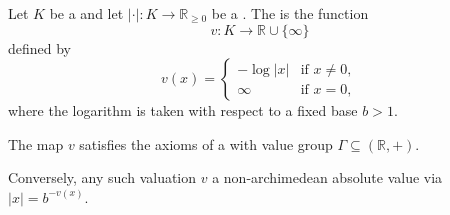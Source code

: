 \begin{definition} \label{definition:valuation_induced_by_a_nonarchimedean_absolute_value_on_a_field}
Let $K$ be a  and let $|\cdot| : K \to \mathbb{R}_{\geq 0}$ be a . The  is the function
\[
v : K \to \mathbb{R} \cup \{\infty\}
\]
defined by
\[
v(x) = 
\begin{cases} 
-\log |x| & \text{if } x \neq 0, \\
\infty & \text{if } x = 0,
\end{cases}
\]
where the logarithm is taken with respect to a fixed base $b > 1$. 

The map $v$ satisfies the axioms of a  with value group $\Gamma \subseteq (\mathbb{R}, +)$. 

Conversely, any such valuation $v$  a non-archimedean absolute value via $|x| = b^{-v(x)}$.
\end{definition}